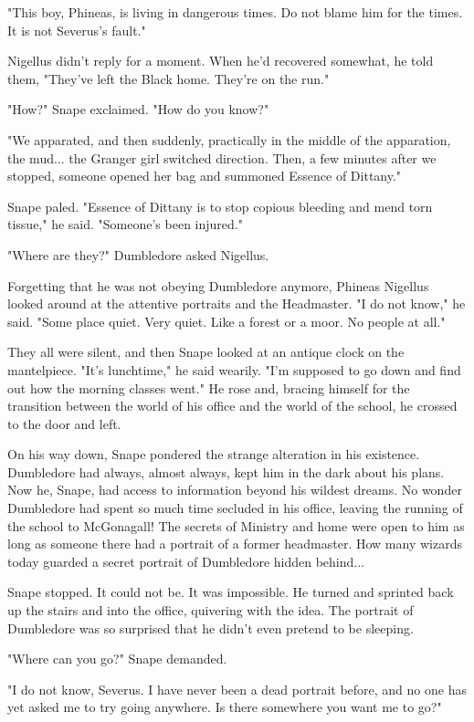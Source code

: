 \documentclass[a4paper,11pt]{article}
\begin{document}
"This boy, Phineas, is living in dangerous times. Do not blame him for the times. It is not Severus's fault."

Nigellus didn't reply for a moment. When he'd recovered somewhat, he told them, "They've left the Black home. They're on the run."

"How?" Snape exclaimed. "How do you know?"

"We apparated, and then suddenly, practically in the middle of the apparation, the mud... the Granger girl switched direction. Then, a few minutes after we stopped, someone opened her bag and summoned Essence of Dittany."

Snape paled. "Essence of Dittany is to stop copious bleeding and mend torn tissue," he said. "Someone's been injured."

"Where are they?" Dumbledore asked Nigellus.

Forgetting that he was not obeying Dumbledore anymore, Phineas Nigellus looked around at the attentive portraits and the Headmaster. "I do not know," he said. "Some place quiet. Very quiet. Like a forest or a moor. No people at all."

They all were silent, and then Snape looked at an antique clock on the mantelpiece. "It's lunchtime," he said wearily. "I'm supposed to go down and find out how the morning classes went." He rose and, bracing himself for the transition between the world of his office and the world of the school, he crossed to the door and left.

On his way down, Snape pondered the strange alteration in his existence. Dumbledore had always, almost always, kept him in the dark about his plans. Now he, Snape, had access to information beyond his wildest dreams. No wonder Dumbledore had spent so much time secluded in his office, leaving the running of the school to McGonagall! The secrets of Ministry and home were open to him as long as someone there had a portrait of a former headmaster. How many wizards today guarded a secret portrait of Dumbledore hidden behind...

Snape stopped. It could not be. It was impossible. He turned and sprinted back up the stairs and into the office, quivering with the idea. The portrait of Dumbledore was so surprised that he didn't even pretend to be sleeping.

"Where can you go?" Snape demanded.

"I do not know, Severus. I have never been a dead portrait before, and no one has yet asked me to try going anywhere. Is there somewhere you want me to go?"
\end{document}
